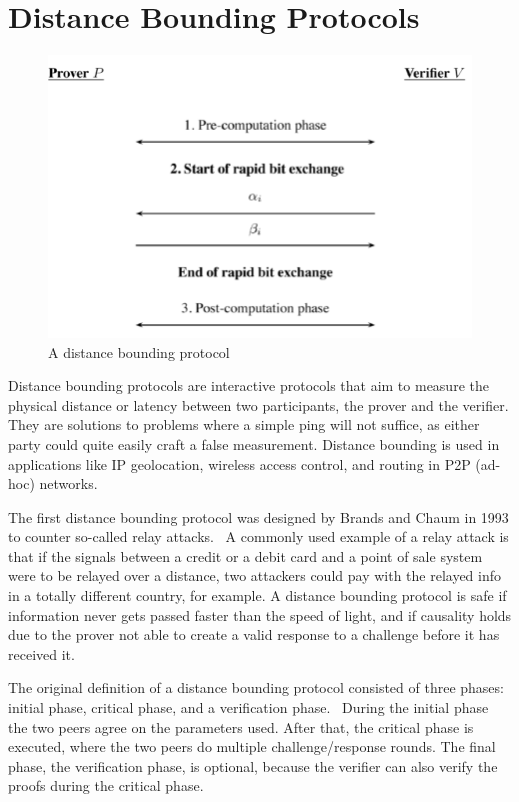 \section{Distance Bounding Protocols}
\begin{figure}
  \includegraphics[width=\textwidth]{pictures/distance_bounding.png}
  \caption{A distance bounding protocol~\cite{Peeters2011-dq}}
  \label{Distance Bounding Protocol}
\end{figure}
Distance bounding protocols are interactive protocols that aim to measure the physical distance or latency between two participants, the prover and the verifier. They are solutions to problems where a simple ping will not suffice, as either party could quite easily craft a false measurement. Distance bounding is used in applications like IP geolocation, wireless access control, and routing in P2P (ad-hoc) networks.

The first distance bounding protocol was designed by Brands and Chaum in 1993 to counter so-called relay attacks.~\cite{Boureanu_undated-bn, Brands1994-hz} A commonly used example of a relay attack is that if the signals between a credit or a debit card and a point of sale system were to be relayed over a distance, two attackers could pay with the relayed info in a totally different country, for example. A distance bounding protocol is safe if information never gets passed faster than the speed of light, and if causality holds due to the prover not able to create a valid response to a challenge before it has received it.~\cite{Boureanu_undated-bn}

The original definition of a distance bounding protocol consisted of three phases: initial phase, critical phase, and a verification phase.~\cite{Brands1994-hz, Mauw2018-uz} During the initial phase the two peers agree on the parameters used. After that, the critical phase is executed, where the two peers do multiple challenge/response rounds. The final phase, the verification phase, is optional, because the verifier can also verify the proofs during the critical phase.

